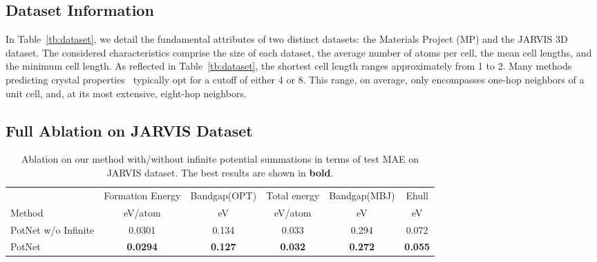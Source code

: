 \documentclass[nohyperref]{article}
\theoremstyle{plain}
\theoremstyle{definition}
\theoremstyle{remark}
\begin{document}
\subsection{Dataset Information}
\label{sec:dataset}

\begin{wraptable}[6]{r}{0.3\textwidth}
\vspace{-40 pt}
\begin{center}
\caption{Dataset information on JARVIS and the Materials Project.}\vspace{-0.2cm}
\label{tb:dataset}
\end{center}
\end{wraptable} In Table~\ref{tb:dataset}, we detail the fundamental attributes of two distinct datasets: the Materials Project (MP) and the JARVIS 3D dataset. The considered characteristics comprise the size of each dataset, the average number of atoms per cell, the mean cell lengths, and the minimum cell length. As reflected in Table~\ref{tb:dataset}, the shortest cell length ranges approximately from 1 to 2. Many methods predicting crystal properties~\cite{xie2018crystal, schutt2017schnet, MegNet, ALIGNN} typically opt for a cutoff of either 4 or 8. This range, on average, only encompasses one-hop neighbors of a unit cell, and, at its most extensive, eight-hop neighbors.

\subsection{Full Ablation on JARVIS Dataset}
\label{sec:full_ablation}
\begin{table*}[t]
\caption{Ablation on our method with/without infinite potential summations in terms of test MAE on JARVIS dataset. The best results are shown in \textbf{bold}.}
\label{tb:full}
\begin{center}
\begin{tabular}{l|ccccc}
\toprule
& Formation Energy & Bandgap(OPT) & Total energy & Bandgap(MBJ) & Ehull\\ 

\cmidrule(r){2-6}
Method & eV/atom  &  eV & eV/atom & eV & eV   \\
\midrule
PotNet w/o Infinite & 0.0301 & 0.134 & 0.033 & 0.294 & 0.072\\
PotNet   & \textbf{0.0294} & \textbf{0.127} & \textbf{0.032} & \textbf{0.272} & \textbf{0.055}\\
\bottomrule
\end{tabular}
\end{center}
\vskip -0.25in
\end{table*}
\end{document}
